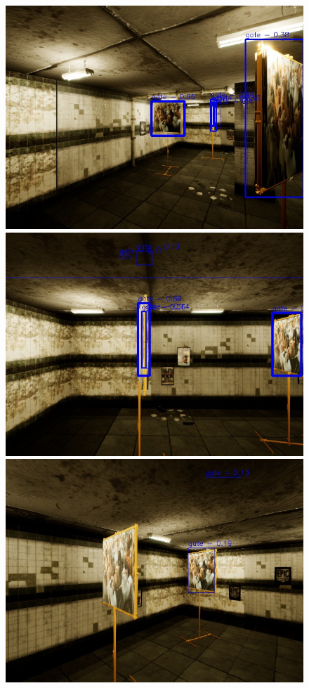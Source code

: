 \documentclass{article}
\begin{document}
 
\begin{figure}
	\centering
	\begin{minipage}{0.3\textwidth}
		\includegraphics[width=\textwidth]{fig/v2_cats}
	\end{minipage}
	\begin{minipage}{0.3\textwidth}
		\includegraphics[width=\textwidth]{fig/v2_cat2}
	\end{minipage}
	\begin{minipage}{0.3\textwidth}
		\includegraphics[width=\textwidth]{fig/v2cats3}

\end{minipage}
\end{figure}
\end{document}
